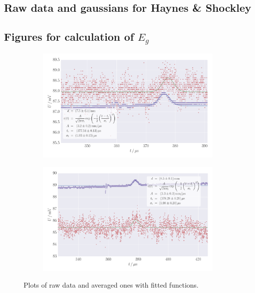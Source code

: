 \subsection{Raw data and gaussians for Haynes \& Shockley}
\subsection{Figures for calculation of $E_g$}
\label{sec:appendix_h_s_plots}
\begin{figure}
    \centering
    \begin{subfigure}[b]{\pltw}
        \includegraphics[width=1.0\linewidth]{figures/haynes_shockley_raw_10}
        \caption{}
        \label{fig:h_s_raw_10}
    \end{subfigure}
    \begin{subfigure}[b]{\pltw}
        \includegraphics[width=1.0\linewidth]{figures/haynes_shockley_raw_12}
        \caption{}
        \label{fig:h_s_raw_12}
    \end{subfigure}
    \caption{
        Plots of raw data and averaged ones with fitted functions. 
        }
    \label{fig:h_s_raw_plots}
\end{figure}
